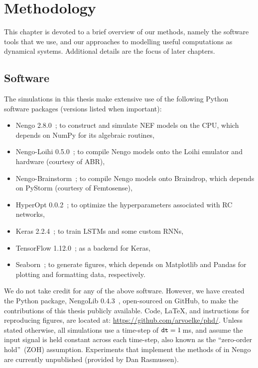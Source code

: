 \chapter{Methodology}
\label{chapt:methodology}

This chapter is devoted to a brief overview of our methods, namely the software tools that we use, and our approaches to modelling useful computations as dynamical systems.
Additional details are the focus of later chapters.

\section{Software}
\label{sec:software}

The simulations in this thesis make extensive use of the following Python software packages (versions listed when important):
\begin{itemize}
\item Nengo 2.8.0~\citep{bekolay2014}; to construct and simulate NEF models on the CPU, which depends on NumPy for its algebraic routines,
\item Nengo-Loihi 0.5.0~\citep{blouw2018a, nengoloihi}; to compile Nengo models onto the Loihi emulator and hardware (courtesy of ABR),
\item Nengo-Brainstorm~\citep[pre-release;][courtesy of Terry Stewart]{neckar2018optimizing, braindrop2019}; to compile Nengo models onto Braindrop, which depends on PyStorm (courtesy of Femtosense),
\item HyperOpt 0.0.2~\citep{bergstra2015hyperopt}; to optimize the hyperparameters associated with RC networks,
\item Keras 2.2.4~\citep{gulli2017deep}; to train LSTMs and some custom RNNs,
\item TensorFlow 1.12.0~\citep{abadi2016tensorflow}; as a backend for Keras,
\item Seaborn~\citep{michael_waskom_2015_19108}; to generate figures, which depends on Matplotlib and Pandas for plotting and formatting data, respectively.
\end{itemize}
We do not take credit for any of the above software.
However, we have created the Python package, NengoLib 0.4.3~\citep[][patent~pending]{dynamicspatent, nengolib}, open-sourced on GitHub, to make the contributions of this thesis publicly available.
Code, \LaTeX{}, and instructions for reproducing figures, are located at: \url{https://github.com/arvoelke/phd/}.
Unless stated otherwise, all simulations use a time-step of $\texttt{dt}{} = 1$\,ms, and assume the input signal is held constant across each time-step, also known as the ``zero-order hold''~(ZOH) assumption.
Experiments that implement the methods of \citet{boerlin2013predictive} in Nengo are currently unpublished (provided by Dan Rasmussen).

